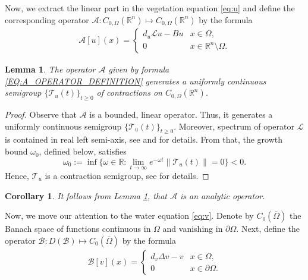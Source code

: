 \documentclass[12pt, a4paper]{article}
\theoremstyle{break}
\theoremstyle{break}
\theoremstyle{break}
\theoremstyle{break}
\theoremstyle{break}
\newtheorem{lem}{Lemma}[section]
\theoremstyle{break}
\newtheorem{cor}{Corollary}[section]
\theoremstyle{break}
\begin{document}
Now, we extract the linear part in the vegetation equation \eqref{eq:u} and define the corresponding operator $\mathcal{A}: C_{0, \Omega}(\mathbb{R}^n) \mapsto C_{0, \Omega}(\mathbb{R}^n)$ by the formula
\begin{align}
    \label{EQ:A_OPERATOR_DEFINITION}
    \mathcal{A}[u](x) =
    \begin{cases}
        d_u\mathcal{L}u - Bu &x \in \Omega, \\
        0 &x \in \mathbb{R}^n \setminus \Omega.
    \end{cases}
\end{align}
\begin{lem}
    \label{lem:A_SEMIGROUP_GENERATOR}
    The operator $\mathcal{A}$ given by formula \eqref{EQ:A_OPERATOR_DEFINITION} generates a uniformly continuous semigroup $\{\mathcal{T}_u(t)\}_{t \geq 0}$ of contractions on $C_{0, \Omega}(\mathbb{R}^n)$.
\end{lem}
\begin{proof}
    Observe that $\mathcal{A}$ is a bounded, linear operator. Thus, it generates a uniformly continuous semigroup $\{\mathcal{T}_u(t)\}_{t \geq 0}$. Moreover, spectrum of operator $\mathcal{L}$ is contained in real left semi-axis, see \cite[Thm. \ldots]{ChasseigneChavesRossi2006} and \cite[Theorem 2.1]{Tadej2025} for details. From that, the growth bound $\omega_0$, defined below, satisfies
    \begin{equation*}
        \omega_0 := \inf\{\omega \in \mathbb{R}: \lim_{t \rightarrow \infty} e^{-\omega t} \|\mathcal{T}_u(t)\| = 0 \} < 0.
    \end{equation*}
    Hence, $\mathcal{T}_u$ is a contraction semigroup, see \cite[Proposition V.1.7]{EngelNagel2000} for details.
\end{proof}
\begin{cor}
    It follows from Lemma \ref{lem:A_SEMIGROUP_GENERATOR}, that $\mathcal{A}$ is an analytic operator.
\end{cor}
Now, we move our attention to the water equation \eqref{eq:v}. Denote by $C_0(\overline{\Omega})$ the Banach space of functions continuous in $\Omega$ and vanishing in $\partial\Omega$. Next, define the operator $\mathcal{B}: D(\mathcal{B}) \mapsto C_0(\overline{\Omega})$ by the formula
\begin{align}
    \label{EQ:B_OPERATOR_DEFINITION}
    \mathcal{B}[v](x) = 
    \begin{cases}
        d_v \Delta v - v &x \in \Omega, \\
        0 &x \in \partial \Omega.
    \end{cases}
\end{align}
\end{document}
